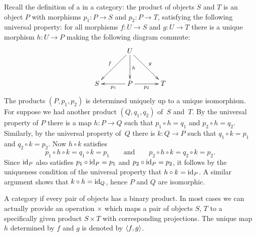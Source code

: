 Recall the definition of a  in a category: the
product of objects $S$ and $T$ is an object $P$ with morphisms $p_1 :
P \to S$ and $p_2 : P \to T$, satisfying the following universal
property: for all morphisms $f : U \to S$ and $g : U \to T$ there is a
unique morphism $h : U \to P$ making the following diagram commute:
%
\begin{equation*}
  \xymatrix@+1em{
    &
    {U}
    \ar[ld]_{f}
    \ar[d]^h
    \ar[rd]^{g}
    &
    \\
    {S}
    &
    {P}
    \ar[l]^{p_1}
    \ar[r]_{p_2}
    &
    {T}
  }
\end{equation*}
%
The products $(P, p_1, p_2)$ is determined uniquely up to a unique
isomorphism. For suppose we had another product $(Q, q_1, q_2)$ of~$S$
and~$T$. By the universal property of $P$ there is a map $h : P \to Q$
such that $p_1 \circ h = q_1$ and $p_2 \circ h = q_2$. Similarly, by
the universal property of~$Q$ there is $k : Q \to P$ such that $q_1
\circ k = p_1$ and $q_2 \circ k = p_2$. Now $h \circ k$ satisfies
%
\begin{equation*}
  p_1 \circ h \circ k = q_1 \circ k = p_1
  \qquad\text{and}\qquad
  p_2 \circ h \circ k = q_2 \circ k = p_2.
\end{equation*}
%
Since $\id[P]$ also satisfies $p_1 \circ \id[P] = p_1$ and $p_2 \circ
\id[P] = p_2$, it follows by the uniqueness condition of the universal
property that $h \circ k = \id[P]$. A similar argument shows that $k
\circ h = \id[Q]$, hence $P$ and $Q$ are isomorphic.

A category  if every pair of objects has a
binary product. In most cases we can actually provide an operation
$\times$ which maps a pair of objects $S$, $T$ to a specifically given
product $S \times T$ with corresponding projections. The unique map
$h$ determined by $f$ and $g$ is denoted by $\pair{f,g}$.

